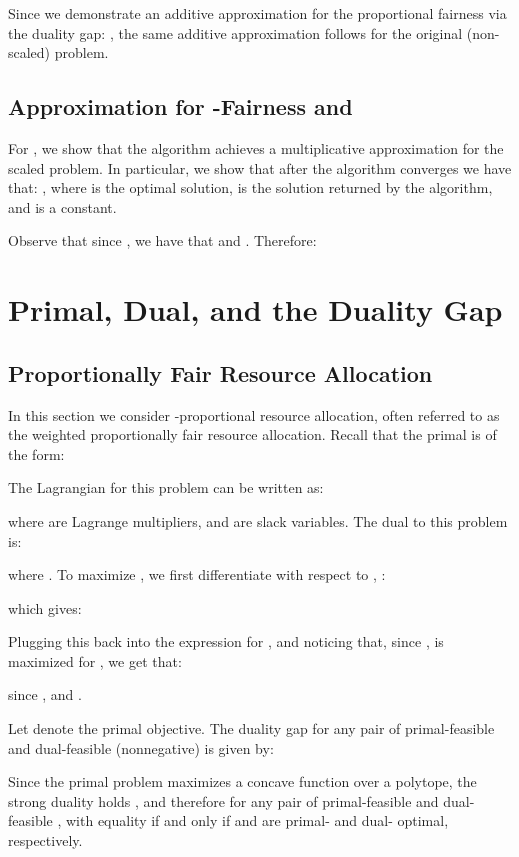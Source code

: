 \documentclass[11pt]{article}
\begin{document}
Since we demonstrate an additive approximation for the proportional fairness via the duality gap: , the same additive approximation follows for the original (non-scaled) problem.

\subsection{Approximation for -Fairness and }
For , we show that the algorithm achieves a multiplicative approximation for the scaled problem. In particular, we show that after the algorithm converges we have that: , where  is the optimal solution,  is the solution returned by the algorithm, and  is a constant.

Observe that since , we have that  and . Therefore:







\section{Primal, Dual, and the Duality Gap}\label{appendix:primal-dual-duality-gap}

\subsection{Proportionally Fair Resource Allocation}

In this section we consider -proportional resource allocation, often referred to as the weighted proportionally fair resource allocation. Recall that the primal is of the form:


The Lagrangian for this problem can be written as:

where  are Lagrange multipliers, and  are slack variables. The dual to this problem is:

where . To maximize , we first differentiate with respect to , :

which gives:

Plugging this back into the expression for , and noticing that, since  ,  is maximized for , we get that:

since  , and .

Let  denote the primal objective. The duality gap for any pair of primal-feasible  and dual-feasible (nonnegative)  is given by:

Since the primal problem maximizes a concave function over a polytope, the strong duality holds \cite{boyd2009convex}, and therefore  for any pair of primal-feasible  and dual-feasible , with equality if and only if  and  are primal- and dual- optimal, respectively.
\end{document}
